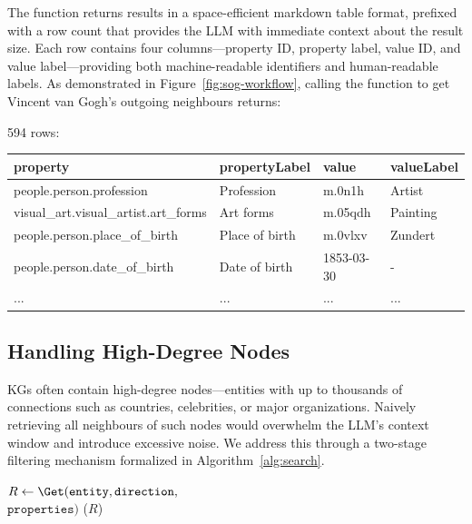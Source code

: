 \documentclass[sigconf]{acmart}
\begin{document}
The function returns results in a space-efficient markdown table format, prefixed with a row count that provides the LLM with immediate context about the result size. Each row contains four columns---property ID, property label, value ID, and value label---providing both machine-readable identifiers and human-readable labels. As demonstrated in Figure~\ref{fig:sog-workflow}, calling the function to get Vincent van Gogh's outgoing neighbours returns:

\begin{functionoutput1}
594 rows:\\[1mm]
\begin{tabular}{l|l|l|l}
property & propertyLabel & value & valueLabel \\
\hline
people.person.profession & Profession & m.0n1h & Artist \\
visual\_art.visual\_artist.art\_forms & Art forms & m.05qdh & Painting \\
people.person.place\_of\_birth & Place of birth & m.0vlxv & Zundert \\
people.person.date\_of\_birth & Date of birth & 1853-03-30 & - \\
... & ... & ... & ...
\end{tabular}
\end{functionoutput1}

\subsection{Handling High-Degree Nodes}
\label{sec:high_degree_handling}

KGs often contain high-degree nodes---entities with up to thousands %
of connections such as countries, celebrities, or major organizations. Naively retrieving all neighbours of such nodes would overwhelm the LLM's context window and introduce excessive noise. We address this through a two-stage filtering mechanism formalized in Algorithm~\ref{alg:search}.

\begin{algorithm}%
\caption{\textsc{Adaptive neighbourhood retrieval}}
\label{alg:search}
\BlankLine
$R \gets \Get(\texttt{entity}, \texttt{direction},$\\
\hspace*{11.7em}$\texttt{properties})$\;
\BlankLine
{}
\Return \Format($R$)\;
\end{algorithm}
\end{document}
